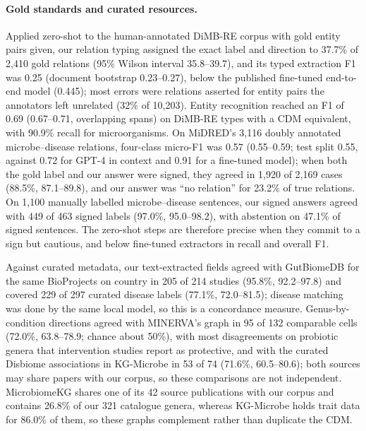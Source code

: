 \documentclass[referee,lineno,pdflatex,sn-vancouver-num]{sn-jnl}
\theoremstyle{thmstyleone}%
\theoremstyle{thmstyletwo}%
\theoremstyle{thmstylethree}%
\begin{document}
\paragraph{Gold standards and curated resources.} Applied zero-shot to the
human-annotated DiMB-RE corpus with gold entity pairs given, our relation
typing assigned the exact label and direction to 37.7\% of 2,410 gold
relations (95\% Wilson interval 35.8--39.7), and its typed extraction F1 was
0.25 (document bootstrap 0.23--0.27), below the published fine-tuned
end-to-end model (0.445); most errors were relations asserted for entity pairs
the annotators left unrelated (32\% of 10,203). Entity recognition reached an
F1 of 0.69 (0.67--0.71, overlapping spans) on DiMB-RE types with a CDM
equivalent, with 90.9\% recall for microorganisms. On MiDRED's 3,116 doubly
annotated microbe--disease relations, four-class micro-F1 was 0.57
(0.55--0.59; test split 0.55, against 0.72 for GPT-4 in context and 0.91 for a
fine-tuned model); when both the gold label and our answer were signed, they
agreed in 1,920 of 2,169 cases (88.5\%, 87.1--89.8), and our answer was ``no
relation'' for 23.2\% of true relations. On 1,100 manually labelled
microbe--disease sentences, our signed answers agreed with 449 of 463 signed
labels (97.0\%, 95.0--98.2), with abstention on 47.1\% of signed sentences.
The zero-shot steps are therefore precise when they commit to a sign but
cautious, and below fine-tuned extractors in recall and overall F1.

Against curated metadata, our text-extracted fields agreed with GutBiomeDB for
the same BioProjects on country in 205 of 214 studies (95.8\%, 92.2--97.8) and
covered 229 of 297 curated disease labels (77.1\%, 72.0--81.5); disease
matching was done by the same local model, so this is a concordance measure.
Genus-by-condition directions agreed with MINERVA's graph in 95 of 132
comparable cells (72.0\%, 63.8--78.9; chance about 50\%), with most
disagreements on probiotic genera that intervention studies report as
protective, and with the curated Disbiome associations in KG-Microbe in 53 of
74 (71.6\%, 60.5--80.6); both sources may share papers with our corpus, so
these comparisons are not independent. MicrobiomeKG shares one of its 42
source publications with our corpus and contains 26.8\% of our 321 catalogue
genera, whereas KG-Microbe holds trait data for 86.0\% of them, so these graphs
complement rather than duplicate the CDM.
\end{document}
